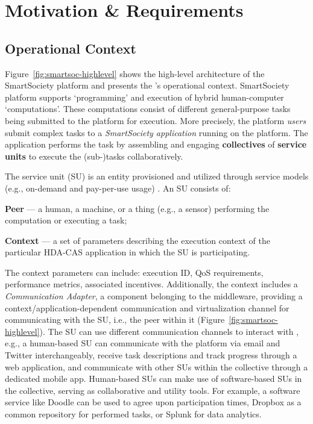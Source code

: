 
  \section{Motivation \& Requirements}

    \subsection{Operational Context}
    \label{sec:intro:context}

      Figure~\ref{fig:smartsoc-highlevel} shows the high-level architecture of the SmartSociety platform and presents the \mdl's operational context. SmartSociety platform supports `programming' and execution of hybrid human-computer `computations'. These computations consist of different general-purpose tasks being submitted to the platform for execution. More precisely, the platform \emph{users} submit complex tasks to a \emph{SmartSociety application} running on the platform. The application performs the task by assembling and engaging \textbf{collectives} of \textbf{service units} to execute the (sub-)tasks collaboratively.

      The service unit (SU) is an entity provisioned and utilized through service models (e.g., on-demand and pay-per-use usage) \cite{truongijcis}. An SU consists of:
        \begin{inparaenum}[\itshape i)]
          \item \textbf{Peer} --- a human, a machine, or a thing (e.g., a sensor) performing the computation or executing a task;
          \item \textbf{Context} --- a set of parameters describing the execution context of the particular HDA-CAS application in which the SU is participating. 
        \end{inparaenum}
      The context parameters can include: execution ID, QoS requirements, performance metrics, associated incentives. Additionally, the context includes a \emph{Communication Adapter}, a component belonging to the \mdl{} middleware, providing a context/application-dependent communication and virtualization channel for communicating with the SU, i.e., the peer within it (Figure~\ref{fig:smartsoc-highlevel}).
      The SU can use different communication channels to interact with \mdl{}, e.g., a human-based SU can communicate with the platform via email and Twitter interchangeably, receive task descriptions and track progress through a web application, and communicate with other SUs within the collective through a dedicated mobile app. Human-based SUs can make use of software-based SUs in the collective, serving as collaborative and utility tools. For example, a software service like Doodle can be used to agree upon participation times, Dropbox as a common repository for performed tasks, or Splunk for data analytics.

